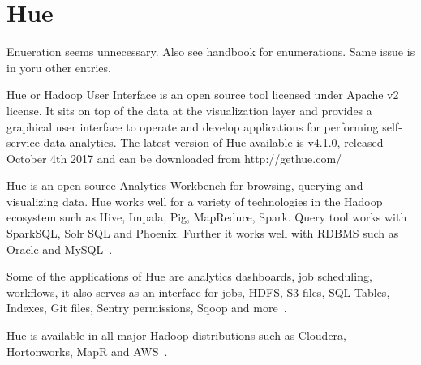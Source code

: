 \section{Hue}

\begin{NOTE}
Enueration seems unnecessary. Also see handbook for enumerations. Same
issue is in yoru other entries.
\end{NOTE}

Hue or Hadoop User Interface is an open source tool licensed 
under Apache v2 license. It sits on top of the data at the 
visualization layer and provides a graphical user interface to 
operate and develop applications for performing self-service 
data analytics.
The latest version of Hue available is v4.1.0, released October 
4th 2017 and can be downloaded from http://gethue.com/
~\cite{hid-sp18-517-hue-apache}

Hue is an open source Analytics Workbench for browsing, querying 
and visualizing data.
Hue works well for a variety of technologies in the Hadoop 
ecosystem such as Hive, Impala, Pig, MapReduce, Spark. Query 
tool works with SparkSQL, Solr SQL and Phoenix. Further it works 
well with RDBMS such as Oracle and MySQL~\cite{hid-sp18-517-Hue-wiki}. 

Some of the applications of Hue are analytics dashboards, job scheduling, 
workflows, it also serves as an interface for jobs, HDFS, S3 files, 
SQL Tables, Indexes, Git files, Sentry permissions, Sqoop and more~\cite{hid-sp18-517-Hue-wiki}.

Hue is available in all major Hadoop distributions such as Cloudera, 
Hortonworks, MapR and AWS~\cite{hid-sp18-517-Hue-wiki}.

